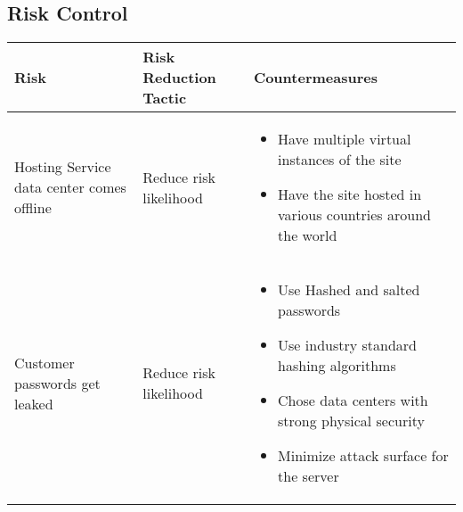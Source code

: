 \subsection{Risk Control}
\begin{tabularx}{\textwidth}{|X|X|X|}
\hline
Risk&Risk Reduction Tactic&Countermeasures\\
\hline
Hosting Service data center comes offline&Reduce risk likelihood&
\begin{itemize}
 \item  Have multiple virtual instances of the site
  \item Have the site hosted in various countries around the world
\end{itemize}
 \\
\hline
Customer passwords get leaked&Reduce risk likelihood&
\begin{itemize}
  \item Use Hashed and salted passwords
  \item Use industry standard hashing algorithms
  \item Chose data centers with strong physical security
  \item Minimize attack surface for the server
\end{itemize}\\
\hline
\end{tabularx}

